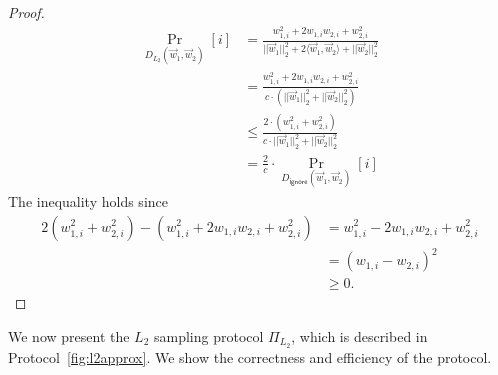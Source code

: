 \begin{proof}
\begin{align*}
    \Pr_{D_{L_2}(\vec{w}_1, \vec{w}_2)}[i] &= \frac{w^2_{1,i} + 2w_{1,i}w_{2,i} + w^2_{2,i}}{||\vec{w}_1||_2^2 + 2\langle \vec{w}_1, \vec{w}_2 \rangle + ||\vec{w}_2||_2^2}\\
    &=  \frac{w^2_{1,i} + 2w_{1,i}w_{2,i} + w^2_{2,i}}{c \cdot (||\vec{w}_1||_2^2  + ||\vec{w}_2||_2^2)}\\
    &\le \frac{2 \cdot (w_{1,i}^2  + w_{2,i}^2)}{c \cdot ||\vec{w}_1||_2^2  + ||\vec{w}_2||_2^2}\\
    & = \frac{2}{c} \cdot \Pr_{D_{\mathsf{ignore}}(\vec{w}_1, \vec{w}_2)}[i]
\end{align*}
The inequality holds since
\begin{align*}
2(w^2_{1,i} + w^2_{2,i}) - (w^2_{1,i} + 2w_{1,i}w_{2,i} + w^2_{2,i}) 
&= w^2_{1,i} -2w_{1,i}w_{2,i} + w^2_{2,i}\\
&= (w_{1,i} - w_{2,i})^2\\
&\geq 0.
\end{align*}
\end{proof}

We now present the $L_2$ sampling protocol $\Pi_{L_2}$, which is described in Protocol~\ref{fig:l2approx}. We show the correctness and efficiency of the protocol. 

